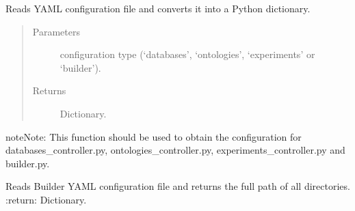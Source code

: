 \documentclass[letterpaper,10pt,english]{sphinxmanual}
\begin{document}
\begin{fulllineitems}
\label{\detokenize{_autosummary/graphdb_builder:graphdb_builder.builder_utils.setup_config}}
Reads YAML configuration file and converts it into a Python dictionary.
\begin{quote}\begin{description}
\item[{Parameters}] \leavevmode
{} \textendash{} configuration type (‘databases’, ‘ontologies’, ‘experiments’ or ‘builder’).

\item[{Returns}] \leavevmode
Dictionary.

\end{description}\end{quote}

\begin{sphinxadmonition}{note}{Note:}
This function should be used to obtain the configuration for databases\_controller.py,                 ontologies\_controller.py, experiments\_controller.py and builder.py.
\end{sphinxadmonition}

\end{fulllineitems}


\begin{fulllineitems}
\label{\detokenize{_autosummary/graphdb_builder:graphdb_builder.builder_utils.get_full_path_directories}}
Reads Builder YAML configuration file and returns the full path of all directories.
:return: Dictionary.

\end{fulllineitems}

\end{document}
